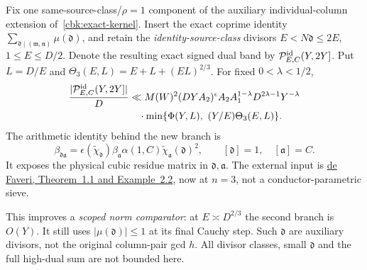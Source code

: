 \begin{proposition}
\label{cbk:cubic}
Fix one same-source-class/$\rho=1$ component of the auxiliary
individual-column extension of~\eqref{cbk:exact-kernel}. Insert the
exact coprime identity $\sum_{\mathfrak d\mid(\mathfrak m,\mathfrak n)}
\mu(\mathfrak d)$, and retain the \emph{identity-source-class} divisors
$E<N\mathfrak d\le2E$, $1\le E\le D/2$. Denote the resulting exact
signed dual band by $\mathcal P^{\rm id}_{E,C}(Y,2Y]$.
Put $L=D/E$ and $\Theta_3(E,L)=E+L+(EL)^{2/3}$.
For fixed $0<\lambda<1/2$,
\begin{equation}\label{cbk:cubic-bound}
 \begin{split}
 \frac{|\mathcal P^{\rm id}_{E,C}(Y,2Y]|}{D}
 &\ll M(W)^2(DYA_2)^\epsilon
       A_2 A_1^{1-\lambda}D^{2\lambda-1}Y^{-\lambda}\\
 &\quad\cdot\min\{\Phi(Y,L),\ (Y/E)\Theta_3(E,L)\}.
 \end{split}
\end{equation}
The arithmetic identity behind the new branch is
\begin{equation}\label{cbk:beta-split}
 \beta_{\mathfrak d\mathfrak a}
 =\epsilon(\widetilde\chi_{\mathfrak d})\beta_{\mathfrak a}
       \alpha(1,C)\widetilde\chi_{\mathfrak a}(\mathfrak d)^2,
 \qquad [\mathfrak d]=1,\quad[\mathfrak a]=C.
\end{equation}
It exposes the physical cubic residue matrix in
$\mathfrak d,\mathfrak a$. The external input is
\href{https://arxiv.org/abs/2610.04045v1}{de Faveri, Theorem~1.1
and Example~2.2}, now at $n=3$, not a conductor-parametric sieve.
\end{proposition}
This improves a \emph{scoped norm comparator}: at $E\asymp D^{2/3}$
the second branch is $O(Y)$. It still uses $|\mu(\mathfrak d)|\le1$
at its final Cauchy step. Such $\mathfrak d$ are auxiliary divisors,
not the original column-pair gcd $h$. All divisor classes, small
$\mathfrak d$ and the full high-dual sum are not bounded here.

